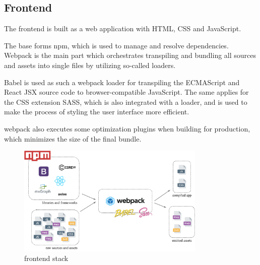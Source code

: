 \documentclass[a4paper,top=25mm,bottom=25mm,12pt,pdftex,halfparskip,twoside,bibtotoc,numbers=noenddot]{scrbook}
\begin{document}
\subsection{Frontend}
The frontend is built as a web application with HTML, CSS and JavaScript.

The base forms npm, which is used to manage and resolve dependencies.  Webpack is the main part which orchestrates transpiling and bundling all sources and assets into single files by utilizing so-called loaders.

Babel is used as such a webpack loader for transpiling the ECMAScript and React JSX source code to browser-compatible JavaScript.
The same applies for the CSS extension SASS, which is also integrated with a loader, and is used to make the process of styling the user interface more efficient.

webpack also executes some optimization plugins when building for production, which minimizes the size of the final bundle.

\begin{figure}[H]
  \centering
  \vspace{0.8cm}
  \includegraphics[width=0.8\textwidth]{frontend-setup}
  \caption{frontend stack}
\end{figure}
\end{document}
